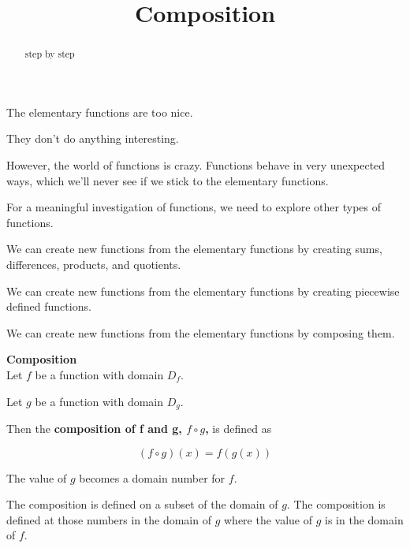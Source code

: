 \documentclass{ximera}
\title{Composition}
\begin{document}
\begin{abstract}
step by step
\end{abstract}
\maketitle



The elementary functions are too nice.

They don't do anything interesting.

However, the world of functions is crazy.  Functions behave in very unexpected ways, which we'll never see if we stick to the elementary functions.

For a meaningful investigation of functions, we need to explore other types of functions.

We can create new functions from the elementary functions by creating sums, differences, products, and quotients.


We can create new functions from the elementary functions by creating piecewise defined functions.


We can create new functions from the elementary functions by composing them. 




\begin{template} \textbf{\textcolor{blue!55!black}{Composition}}  \\


Let $f$ be a function with domain $D_f$.


Let $g$ be a function with domain $D_g$.




Then the \textbf{\textcolor{green!50!black}{composition of f and g, $f \circ g$,}} is defined as

\[
(f \circ g)(x) = f(g(x))
\] 


The value of $g$ becomes a domain number for $f$.


The composition is defined on a subset of the domain of $g$.  The composition is defined at those numbers in the domain of $g$ where the value of $g$ is in the domain of $f$.




\end{template}
\end{document}
